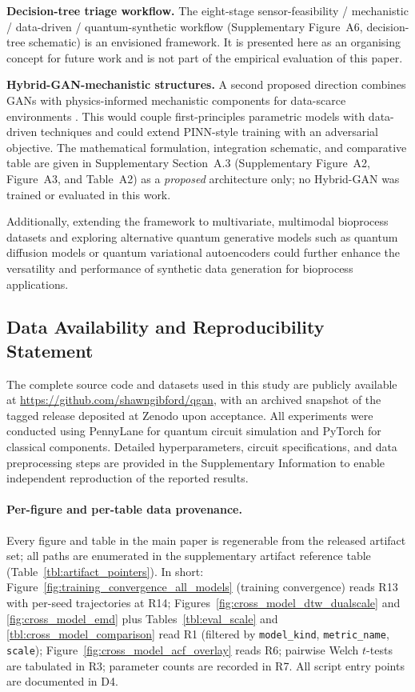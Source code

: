 \documentclass[12pt,twocolumn]{article}
\begin{document}
\textbf{Decision-tree triage workflow.} The eight-stage sensor-feasibility / mechanistic / data-driven / quantum-synthetic workflow (Supplementary Figure~A6, decision-tree schematic) is an envisioned framework. It is presented here as an organising concept for future work and is not part of the empirical evaluation of this paper.

\textbf{Hybrid-GAN-mechanistic structures.} A second proposed direction combines GANs with physics-informed mechanistic components for data-scarce environments \cite{mansouri2025models, nielsen2020hybrid, nazemzadeh2021integration, ehtesham2025dynamics}. This would couple first-principles parametric models with data-driven techniques \cite{sharma2022hybrid, O'Brien2021A} and could extend PINN-style training with an adversarial objective. The mathematical formulation, integration schematic, and comparative table are given in Supplementary Section~A.3 (Supplementary Figure~A2, Figure~A3, and Table~A2) as a \emph{proposed} architecture only; no Hybrid-GAN was trained or evaluated in this work.

Additionally, extending the framework to multivariate, multimodal bioprocess datasets and exploring alternative quantum generative models such as quantum diffusion models or quantum variational autoencoders could further enhance the versatility and performance of synthetic data generation for bioprocess applications.

\subsection*{Data Availability and Reproducibility Statement}
The complete source code and datasets used in this study are publicly
available at \url{https://github.com/shawngibford/qgan}, with an archived
snapshot of the tagged release deposited at Zenodo upon acceptance.
All experiments were conducted using PennyLane
for quantum circuit simulation and PyTorch for classical components.
Detailed hyperparameters, circuit specifications, and data preprocessing
steps are provided in the Supplementary Information to enable independent
reproduction of the reported results.

\paragraph{Per-figure and per-table data provenance.}
Every figure and table in the main paper is regenerable from the released
artifact set; all paths are enumerated in the supplementary artifact
reference table (Table~\ref{tbl:artifact_pointers}). In short:
Figure~\ref{fig:training_convergence_all_models} (training convergence)
reads R13 with per-seed trajectories at R14;
Figures~\ref{fig:cross_model_dtw_dualscale} and
\ref{fig:cross_model_emd} plus Tables~\ref{tbl:eval_scale} and
\ref{tbl:cross_model_comparison} read R1 (filtered by
\texttt{model\_kind}, \texttt{metric\_name}, \texttt{scale});
Figure~\ref{fig:cross_model_acf_overlay} reads R6;
pairwise Welch $t$-tests are tabulated in R3;
parameter counts are recorded in R7. All script entry points are
documented in D4.
\end{document}
